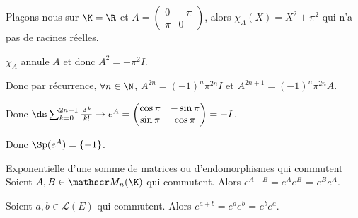 
\begin{exemple}
    Plaçons nous sur $\K = \R$ et $A = \begin{pmatrix}
    0 & -\pi \\
    \pi & 0
    \end{pmatrix}$, alors $\chi_A(X) = X^2 + \pi^2$ qui n'a pas de racines réelles. 

    $\chi_A$ annule $A$ et donc $A^2 = -\pi^2 I$. 

    Donc par récurrence, $\forall n \in \N$, $A^{2n} = (-1)^n \pi^{2n} I$ et $A^{2n + 1} = (-1)^n \pi^{2n} A$.

    Donc $\ds \sum_{k = 0}^{2n + 1} \frac{A^k}{k!} \to e^A = \begin{pmatrix}
    \cos \pi & -\sin \pi \\
    \sin \pi & \cos \pi
    \end{pmatrix} = -I$.

    Donc $\Sp(e^A) = \{-1\}$. 
\end{exemple}


\begin{theorement}{Exponentielle d'une somme de matrices ou d'endomorphismes qui commutent}{}
    Soient $A, B \in \mathscr M_n(\K)$ qui commutent. Alors $e^{A + B} = e^A e^B$ = $e^B e^A$.
    
    Soient $a, b \in \mathscr L(E)$ qui commutent. Alors $e^{a + b} = e^a e^b$ = $e^b e^a$.
\end{theorement}


